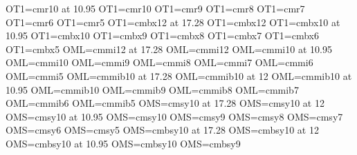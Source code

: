  OT1\font\xirmm=cmr10 at 10.95\Unit%
 OT1\font\tenrmm=cmr10%
 OT1\font\ninermm=cmr9%
 OT1\font\eightrmm=cmr8%
 OT1\font\sevenrmm=cmr7%
 OT1\font\sixrmm=cmr6%
 OT1\font\fivermm=cmr5%
 OT1\font\xviibfm=cmbx12 at 17.28\Unit%
 OT1\font\xiibfm=cmbx12%
 OT1\font\xibfm=cmbx10 at 10.95\Unit%
 OT1\font\tenbfm=cmbx10%
 OT1\font\ninebfm=cmbx9%
 OT1\font\eightbfm=cmbx8%
 OT1\font\sevenbfm=cmbx7%
 OT1\font\sixbfm=cmbx6%
 OT1\font\fivebfm=cmbx5%
 OML\font\xviii=cmmi12 at 17.28\Unit%
\skewchar{}%
 OML\font\xiii=cmmi12%
\skewchar{}%
 OML\font\xii=cmmi10 at 10.95\Unit%
\skewchar{}%
 OML\font\teni=cmmi10%
\skewchar{}%
 OML\font\ninei=cmmi9%
\skewchar{}%
 OML\font\eighti=cmmi8%
\skewchar{}%
 OML\font\seveni=cmmi7%
\skewchar{}%
 OML\font\sixi=cmmi6%
\skewchar{}%
 OML\font\fivei=cmmi5%
\skewchar{}%
 OML\font\xviibi=cmmib10 at 17.28\Unit%
\skewchar{}%
 OML\font\xiibi=cmmib10 at 12\Unit%
\skewchar{}%
 OML\font\xibi=cmmib10 at 10.95\Unit%
\skewchar{}%
 OML\font\tenbi=cmmib10%
\skewchar{}%
 OML\font\ninebi=cmmib9%
\skewchar{}%
 OML\font\eightbi=cmmib8%
\skewchar{}%
 OML\font\sevenbi=cmmib7%
\skewchar{}%
 OML\font\sixbi=cmmib6%
\skewchar{}%
 OML\font\fivebi=cmmib5%
\skewchar{}%
 OMS\font\xviisy=cmsy10 at 17.28\Unit%
\skewchar{}%
 OMS\font\xiisy=cmsy10 at 12\Unit%
\skewchar{}%
 OMS\font\xisy=cmsy10 at 10.95\Unit%
\skewchar{}%
 OMS\font\tensy=cmsy10%
\skewchar{}%
 OMS\font\ninesy=cmsy9%
\skewchar{}%
 OMS\font\eightsy=cmsy8%
\skewchar{}%
 OMS\font\sevensy=cmsy7%
\skewchar{}%
 OMS\font\sixsy=cmsy6%
\skewchar{}%
 OMS\font\fivesy=cmsy5%
\skewchar{}%
 OMS\font\xviibsy=cmbsy10 at 17.28\Unit%
\skewchar{}%
 OMS\font\xiibsy=cmbsy10 at 12\Unit%
\skewchar{}%
 OMS\font\xibsy=cmbsy10 at 10.95\Unit%
\skewchar{}%
 OMS\font\tenbsy=cmbsy10%
\skewchar{}%
 OMS\font\ninebsy=cmbsy9%
